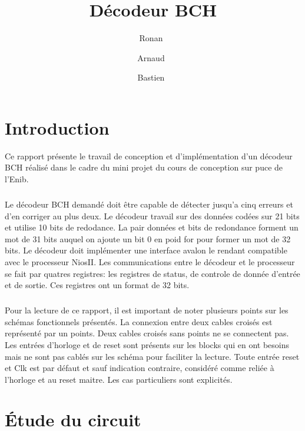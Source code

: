 \documentclass[a4paper, 11pt, svgnames]{report}
\title{Décodeur BCH}
\author{Ronan~\bsc{Le Guillou} \and Arnaud~\bsc{Levaufre} \and Bastien~\bsc{Orivel}}
\begin{document}
    \maketitle
    \tableofcontents
    \printglossaries
    \listoffigures
    \listoftables

    \chapter{Introduction}

    Ce rapport présente le travail de conception et d'implémentation d'un
    décodeur BCH réalisé dans le cadre du mini projet du cours de conception
    sur puce de l'Enib.

    \paragraph{}
    Le décodeur BCH demandé doit être capable de détecter jusqu'a cinq erreurs
    et d'en corriger au plus deux. Le décodeur travail sur des données codées
    sur 21 bits et utilise 10 bits de redodance. La pair données et bits de
    redondance forment un mot de 31 bits auquel on ajoute un bit 0 en poid for
    pour former un mot de 32 bits. Le décodeur doit implémenter une interface
    avalon le rendant compatible avec le processeur NiosII. Les communications
    entre le décodeur et le processeur se fait par quatres registres: les
    registres de status, de controle de donnée d'entrée et de sortie. Ces
    registres ont un format de 32 bits.

    \paragraph{}
    Pour la lecture de ce rapport, il est important de noter plusieurs points
    sur les schémas fonctionnels présentés. La connexion entre deux cables
    croisés est représenté par un points. Deux cables croisés sans points ne se
    connectent pas. Les entrées d'horloge et de reset sont présents sur les
    blocks qui en ont besoins mais ne sont pas cablés sur les schéma pour
    faciliter la lecture. Toute entrée reset et Clk est par défaut et sauf
    indication contraire, considéré comme reliée à l'horloge et au reset
    maitre. Les cas particuliers sont explicités.

    \chapter{Étude du circuit}
\end{document}
